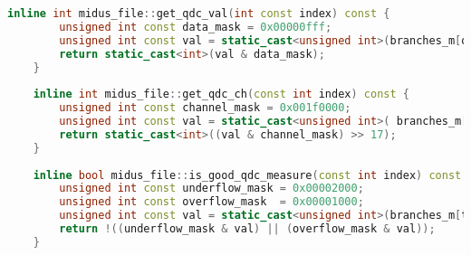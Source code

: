 \documentclass[]{article}
\begin{document}
\begin{center}
	\begin{lstlisting}[caption={Functions used for de-serialising CAEN V792N \ref{REF FOR THE DATA SHEET} QDC, written in C++}, language=C++, float=htbp]
    inline int midus_file::get_qdc_val(int const index) const {
    	unsigned int const data_mask = 0x00000fff;
    	unsigned int const val = static_cast<unsigned int>(branches_m[qdc_i].data[index]);
    	return static_cast<int>(val & data_mask); 
    }
    
    inline int midus_file::get_qdc_ch(const int index) const {
        unsigned int const channel_mask = 0x001f0000;
        unsigned int const val = static_cast<unsigned int>( branches_m[qdc_i].data[index]);
        return static_cast<int>((val & channel_mask) >> 17);
    }
    
    inline bool midus_file::is_good_qdc_measure(const int index) const {
        unsigned int const underflow_mask = 0x00002000;
        unsigned int const overflow_mask  = 0x00001000;
        unsigned int const val = static_cast<unsigned int>(branches_m[tdc_i].data[index]);
        return !((underflow_mask & val) || (overflow_mask & val));
    }
	\end{lstlisting}

\end{center}



\end{document}
